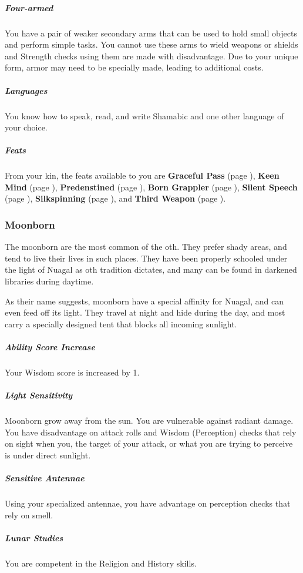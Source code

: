     \subparagraph{Four-armed} You have a pair of weaker secondary arms that can be used to hold small objects and perform simple tasks.
    You cannot use these arms to wield weapons or shields and Strength checks using them are made with disadvantage.
    Due to your unique form, armor may need to be specially made, leading to additional costs.

    \subparagraph{Languages} You know how to speak, read, and write Shamabic and one other language of your choice.

    \subparagraph{Feats} From your kin, the feats available to you are
    \textbf{Graceful Pass} (page \pageref{feat::gracefulpass}),
    \textbf{Keen Mind} (page \pageref{feat::keenmind}),
    \textbf{Predenstined} (page \pageref{feat::predenstined}),
    \textbf{Born Grappler} (page \pageref{feat::borngrappler}),
    \textbf{Silent Speech} (page \pageref{feat::silentspeech}),
    \textbf{Silkspinning} (page \pageref{feat::silkspinning}), and
    \textbf{Third Weapon} (page \pageref{feat::thirdweapon}).

\subsubsection{Moonborn}
    The moonborn are the most common of the oth.
    They prefer shady areas, and tend to live their lives in such places.
    They have been properly schooled under the light of Nuagal as oth tradition dictates, and many can be found in darkened libraries during daytime.

    As their name suggests, moonborn have a special affinity for Nuagal, and can even feed off its light.
    They travel at night and hide during the day, and most carry a specially designed tent that blocks all incoming sunlight.

    \subparagraph{Ability Score Increase} Your Wisdom score is increased by 1.

    \subparagraph{Light Sensitivity} Moonborn grow away from the sun.
    You are vulnerable against radiant damage.
    You have disadvantage on attack rolls and Wisdom (Perception) checks that rely on sight when you, the target of your attack, or what you are trying to perceive is under direct sunlight.

    \subparagraph{Sensitive Antennae} Using your specialized antennae, you have advantage on perception checks that rely on smell.

    \subparagraph{Lunar Studies} You are competent in the Religion and History skills.

